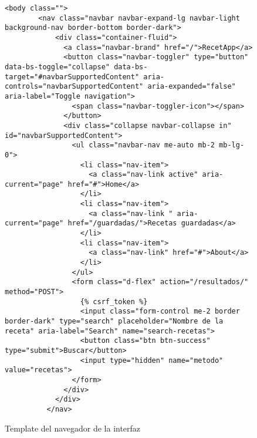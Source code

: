 \begin{figure}[H]
\begin{lstlisting}[style=consola]
    <body class="">
        <nav class="navbar navbar-expand-lg navbar-light background-nav border-bottom border-dark">
            <div class="container-fluid">
              <a class="navbar-brand" href="/">RecetApp</a>
              <button class="navbar-toggler" type="button" data-bs-toggle="collapse" data-bs-target="#navbarSupportedContent" aria-controls="navbarSupportedContent" aria-expanded="false" aria-label="Toggle navigation">
                <span class="navbar-toggler-icon"></span>
              </button>
              <div class="collapse navbar-collapse in" id="navbarSupportedContent">
                <ul class="navbar-nav me-auto mb-2 mb-lg-0">
                  <li class="nav-item">
                    <a class="nav-link active" aria-current="page" href="#">Home</a>
                  </li>
                  <li class="nav-item">
                    <a class="nav-link " aria-current="page" href="/guardadas/">Recetas guardadas</a>
                  </li>
                  <li class="nav-item">
                    <a class="nav-link" href="#">About</a>
                  </li>
                </ul>
                <form class="d-flex" action="/resultados/" method="POST">
                  {% csrf_token %}
                  <input class="form-control me-2 border border-dark" type="search" placeholder="Nombre de la receta" aria-label="Search" name="search-recetas">
                  <button class="btn btn-success" type="submit">Buscar</button>
                  <input type="hidden" name="metodo" value="recetas">
                </form>
              </div>
            </div>
          </nav>
\end{lstlisting}
\caption{Template del navegador de la \gls{interfaz}}
\label{sni:interfaz}
\end{figure}

